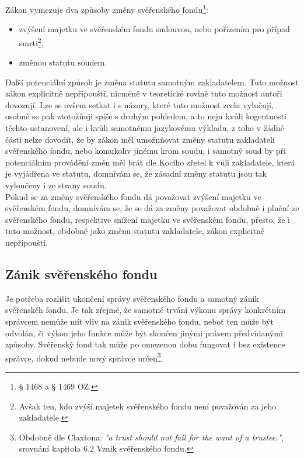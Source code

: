 \documentclass{article}
\begin{document}
Zákon vymezuje dva způsoby změny svěřenského fondu\footnote{§ 1468 a § 1469 OZ.}:\\

\begin{itemize}
\item zvýšení majetku ve svěřenském fondu smlouvou, nebo pořízením pro případ smrti\footnote{Avšak ten, kdo zvýší majetek svěřenského fondu není považován za jeho zakladatele.},
\item změnou statutu soudem.	
\end{itemize}

Další potenciální způsob je změna statutu samotným zakladatelem. Tuto možnost zákon explicitně nepřipouští, nicméně v teoretické rovině tuto možnost autoři dovozují. Lze se ovšem setkat i s názory, které tuto možnost zcela vylučují, osobně se pak ztotožňuji spíše s druhým pohledem, a to nejn kvůli kogentnosti těchto ustanovení, ale i kvůli samotnému jazykovému výkladu, z toho v žádné části nelze dovodit, že by zákon měl umožnňovat změny statutu zakladateli svěřenského fondu, nebo komukoliv jinému krom soudu, i samotný soud by při potenciálním provádění změn měl brát dle Kocího zřetel k vůli zakladatele, která je vyjádřena ve statutu, domnívám se, že zásadní změny statutu jsou tak vyloučeny i ze strany soudu.\\

Pokud se za změny svěřenského fondu dá považovat zvýšení majetku ve svěřenském fondu, domnívám se, že se dá za změny považovat obdobně i plnění ze svěřenského fondu, respektive snížení majetku ve svěřenském fondu, přesto, že i tuto možnost, obdobně jako změnu statutu zakladatele, zákon explicitně nepřipouští.\\

\subsection{Zánik svěřenského fondu}

Je potřeba rozlišit ukončení správy svěřenského fondu a samotný zánik svěřenskéh fondu. Je tak zřejmé, že samotné trvání výkonu správy konkrétním správcem nemůže mít vliv na zánik svěřenského fondu, neboť ten může být odvolán, či výkon jeho funkce může být skončen jinými právem předvídanými způsoby. Svěřenský fond tak může po omezenou dobu fungovat i bez existence správce, dokud nebude nový správce určen\footnote{Obdobně dle Claxtona: \textit{"a trust should not fail for the want of a trustee."}, srovnání kapitola 6.2 Vznik svěřenského fondu.}.\\
\end{document}
